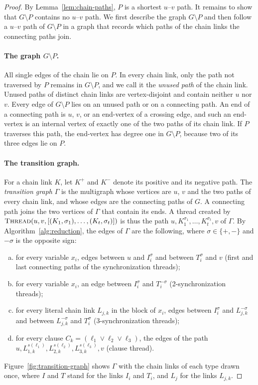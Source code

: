 \documentclass[a4paper,fleqn]{cas-sc}
\numberwithin{equation}{section}
\theoremstyle{definition}
\theoremstyle{plain}
\theoremstyle{remark}
\begin{document}
\begin{proof}
By Lemma~\ref{lem:chain-paths}, $P$ is a shortest $u$--$v$ path.
It remains to show that $G \setminus P$ contains no $u$--$v$ path.
We first describe the graph $G \setminus P$ and then follow a $u$--$v$ path of $G \setminus P$ in a graph that records which paths of the chain links the connecting paths join.

\paragraph{The graph $G \setminus P$.}
All single edges of the chain lie on $P$.
In every chain link, only the path not traversed by $P$ remains in $G \setminus P$, and we call it the \emph{unused path} of the chain link.
Unused paths of distinct chain links are vertex-disjoint and contain neither $u$ nor $v$.
Every edge of $G \setminus P$ lies on an unused path or on a connecting path.
An end of a connecting path is $u$, $v$, or an end-vertex of a crossing edge, and such an end-vertex is an internal vertex of exactly one of the two paths of its chain link.
If $P$ traverses this path, the end-vertex has degree one in $G \setminus P$, because two of its three edges lie on $P$.

\paragraph{The transition graph.}
For a chain link $K$, let $K^{+}$ and $K^{-}$ denote its positive and its negative path.
The \emph{transition graph} $\Gamma$ is the multigraph whose vertices are $u$, $v$ and the two paths of every chain link, and whose edges are the connecting paths of $G$.
A connecting path joins the two vertices of $\Gamma$ that contain its ends.
A thread created by $\textsc{Thread}(u,v,\allowbreak[(K_1,\sigma_1),\dots,(K_t,\sigma_t)])$ is thus the path $u, K_1^{\sigma_1}, \dots, K_t^{\sigma_t}, v$ of $\Gamma$.
By Algorithm~\ref{alg:reduction}, the edges of $\Gamma$ are the following, where $\sigma \in \{+,-\}$ and $-\sigma$ is the opposite sign:
\begin{enumerate}[(a)]
  \item for every variable $x_i$, edges between $u$ and $I_i^{\sigma}$ and between $T_i^{\sigma}$ and $v$ (first and last connecting paths of the synchronization threads);
  \item for every variable $x_i$, an edge between $I_i^{\sigma}$ and $T_i^{-\sigma}$ (2-synchronization threads);
  \item for every literal chain link $L_{j,k}$ in the block of $x_i$, edges between $I_i^{\sigma}$ and $L_{j,k}^{-\sigma}$ and between $L_{j,k}^{-\sigma}$ and $T_i^{\sigma}$ (3-synchronization threads);
  \item for every clause $C_k = (\ell_1 \vee \ell_2 \vee \ell_3)$, the edges of the path $u, L_{1,k}^{s(\ell_1)}, L_{2,k}^{s(\ell_2)}, L_{3,k}^{s(\ell_3)}, v$ (clause thread).
\end{enumerate}
Figure~\ref{fig:transition-graph} shows $\Gamma$ with the chain links of each type drawn once, where $I$ and $T$ stand for the links $I_i$ and $T_i$, and $L_j$ for the links $L_{j,k}$.


\end{proof}
\end{document}
